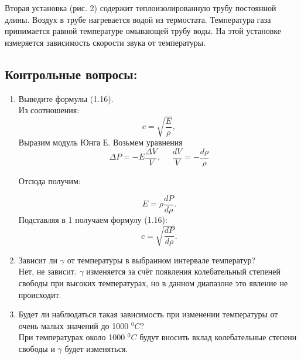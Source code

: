 \documentclass[a4paper,12pt]{article}
\begin{document}
Вторая установка (рис. 2) содержит теплоизолированную трубу постоянной длины. Воздух в трубе нагревается водой из термостата. Температура газа принимается равной температуре омывающей трубу воды. На этой установке измеряется зависимость скорости звука от температуры.


\subsection{Контрольные вопросы:}
\begin{enumerate}
\itemsep0em
\item Выведите формулы (1.16).\\

Из соотношения:
\[
c = \sqrt{\frac{E}{\rho}},
\]
Выразим модуль Юнга Е. Возьмем уравнения
\[
\Delta P = - E\frac{\Delta V}{V}, \;\;\;\;\ \frac{dV}{V} = - \frac{d\rho}{\rho}
\]

Отсюда получим: 

\[
E = \rho \frac{dP}{d\rho}.
\]
Подставляя в 1 получаем формулу (1.16):
\[
c = \sqrt{\frac{dP}{d\rho}}.
\]

\item Зависит ли $\gamma$ от температуры в выбранном интервале температур?\\

Нет, не зависит. $\gamma$ изменяется за счёт появления колебательный степеней свободы при высоких температурах, но в данном диапазоне это явление не происходит.

\item Будет ли наблюдаться такая зависимость при изменении температуры от очень малых значений до 1000 $^0C$?\\

 При температурах около 1000 $ ^0C$ будут вносить вклад колебательные степени свободы и $\gamma$ будет изменяться.
\end{enumerate}
\end{document}
